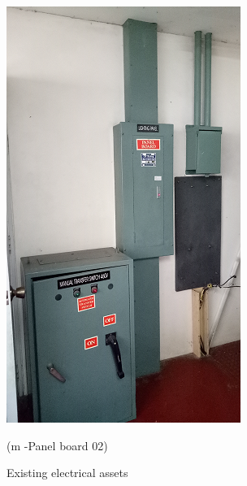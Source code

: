 \begin{figure}
\begin{minipage}[b]{0.22\linewidth}
	\includegraphics[width=\textwidth]{figures/asv_visualpanelnoards}
	\caption*{(m -Panel board 02)}
\end{minipage}

	\caption{Existing electrical assets}
	\label{fig_ch04_elecaudit_visualinspection}
\end{figure}